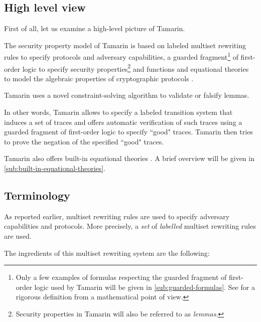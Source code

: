 \subsection{High level view}
First of all, let us examine a high-level picture of Tamarin.

The security property model of Tamarin is based on labeled multiset rewriting rules to specify protocols and adversary capabilities, a guarded fragment\footnote{Only a few examples of formulas respecting the guarded fragment of first-order logic used by Tamarin will be given in \cref{sub:guarded-formulas}. See \cite{FragmentFirstOrderLogicPaper} for a rigorous definition from a mathematical point of view.} of first-order logic to specify security properties\footnote{Security properties in Tamarin will also be referred to as \textit{lemmas}.} and functions and equational theories to model the algebraic properties of cryptographic protocols \cite{TamarinFoundations}.

Tamarin uses a novel constraint-solving algorithm to validate or falsify lemmas.

In other words, Tamarin allows to specify a labeled transition system that induces a set of traces and offers automatic verification of such traces using a guarded fragment of first-order logic to specify ``good" traces. Tamarin then tries to prove the negation of the specified ``good" traces.

Tamarin also offers built-in equational theories \cite{TamarinProverManual}. A brief overview will be given in \cref{sub:built-in-equational-theories}.

\subsection{Terminology}
\label{subsec:tamarin-foundations-terminology}
As reported earlier, multiset rewriting rules are used to specify adversary capabilities and protocols. More precisely, a \textit{set} of \textit{labelled} multiset rewriting rules are used.

The ingredients of this multiset rewriting system are the following:

